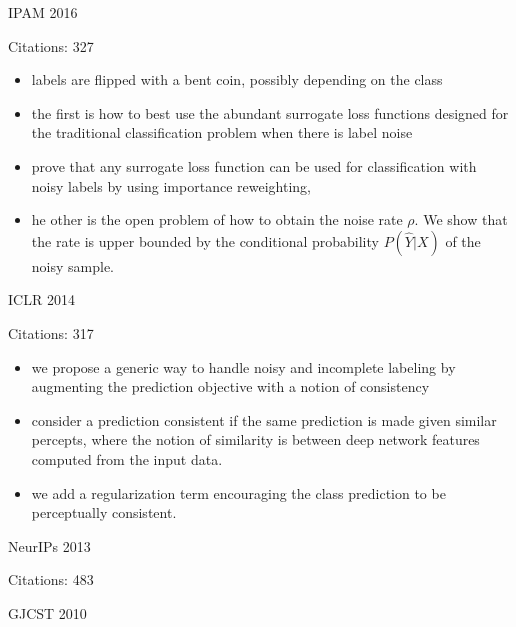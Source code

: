 \documentclass[11pt]{article}
\begin{document}
\vspace{2cm}

\noindent IPAM 2016

\noindent Citations: 327

\begin{itemize}
\item labels are flipped with a bent coin, possibly depending on the class
\item the first is how to best use the abundant surrogate loss functions designed for the traditional classification problem when there is label noise
\item  prove that any surrogate loss function can be used for classification with noisy labels by using importance reweighting,
\item he other is the open problem of how to obtain the noise rate $\rho$. We show that the rate is upper bounded by the conditional probability $P(\hat{Y} |X)$ of the noisy sample.
\end{itemize}

\vspace{2cm}

\noindent ICLR 2014

\noindent Citations: 317

\begin{itemize}
\item we propose a generic way to handle noisy and incomplete labeling by augmenting the prediction objective with a notion of consistency
\item consider a prediction consistent if the same prediction is made given similar percepts, where the notion of similarity is between deep network features computed from the input data.
\item we add a regularization term encouraging the class prediction to be perceptually consistent.
\end{itemize}

\vspace{2cm}

\noindent NeurIPs 2013

\noindent Citations: 483

\vspace{2cm}

\noindent GJCST 2010
\end{document}
